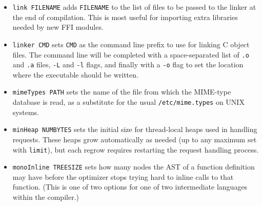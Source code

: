 \documentclass{article}
\begin{document}
\begin{itemize}
\begin{itemize}
  \item \texttt{headers}: maximum size (in bytes) of per-request buffer used to hold HTTP headers for generated pages
  \item \texttt{heap}: maximum size (in bytes) of per-request heap for dynamically allocated data
  \item \texttt{inputs}: maximum number of top-level form fields per request
  \item \texttt{messages}: maximum size (in bytes) of per-request buffer used to hold a single outgoing message sent with \texttt{Basis.send}
  \item \texttt{page}: maximum size (in bytes) of per-request buffer used to hold HTML content of generated pages
  \item \texttt{script}: maximum size (in bytes) of per-request buffer used to hold JavaScript content of generated pages
  \item \texttt{subinputs}: maximum number of form fields per request, excluding top-level fields
  \item \texttt{time}: maximum running time of a single page request, in units of approximately 0.1 seconds
  \item \texttt{transactionals}: maximum number of custom transactional actions (e.g., sending an e-mail) that may be run in a single page generation
  \end{itemize}
\item \texttt{link FILENAME} adds \texttt{FILENAME} to the list of files to be passed to the linker at the end of compilation.  This is most useful for importing extra libraries needed by new FFI modules.
\item \texttt{linker CMD} sets \texttt{CMD} as the command line prefix to use for linking C object files.  The command line will be completed with a space-separated list of \texttt{.o} and \texttt{.a} files, \texttt{-L} and \texttt{-l} flags, and finally with a \texttt{-o} flag to set the location where the executable should be written.
\item \texttt{mimeTypes PATH} sets the name of the file from which the MIME-type database is read, as a substitute for the usual \texttt{/etc/mime.types} on UNIX systems.
\item \texttt{minHeap NUMBYTES} sets the initial size for thread-local heaps used in handling requests.  These heaps grow automatically as needed (up to any maximum set with \texttt{limit}), but each regrow requires restarting the request handling process.
\item \texttt{monoInline TREESIZE} sets how many nodes the AST of a function definition may have before the optimizer stops trying hard to inline calls to that function.  (This is one of two options for one of two intermediate languages within the compiler.)

\end{itemize}
\end{document}
